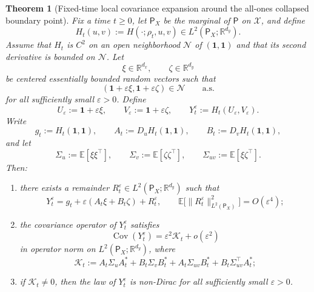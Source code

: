 \documentclass[11pt]{article}
\newtheorem{theorem}{Theorem}[section]
\theoremstyle{definition}
\newcommand{\R}{\mathbb{R}}
\newcommand{\E}{\mathbb{E}}
\begin{document}
\begin{theorem}[Fixed-time local covariance expansion around the all-ones collapsed boundary point]
\label{thm:local-covariance}
Fix a time $t\ge 0$, let $\mathsf P_X$ be the marginal of $\mathsf P$ on
$\mathcal X$, and define
\[
  H_t(u,v)
  :=
  H(\cdot;\rho_t,u,v)
  \in
  L^2(\mathsf P_X;\R^{d_y}).
\]
Assume that $H_t$ is $C^2$ on an open neighborhood $\mathcal N$ of
$(\mathbf 1,\mathbf 1)$ and that its second derivative is bounded on
$\mathcal N$. Let
\[
  \xi\in\R^{d_x},
  \qquad
  \zeta\in\R^{d_y}
\]
be centered essentially bounded random vectors such that
\[
  (\mathbf 1+\varepsilon\xi,\mathbf 1+\varepsilon\zeta)\in\mathcal N
  \qquad
  \text{a.s.}
\]
for all sufficiently small $\varepsilon>0$. Define
\[
  U_\varepsilon:=\mathbf 1+\varepsilon\xi,
  \qquad
  V_\varepsilon:=\mathbf 1+\varepsilon\zeta,
  \qquad
  Y_t^\varepsilon:=H_t(U_\varepsilon,V_\varepsilon).
\]
Write
\[
  g_t:=H_t(\mathbf 1,\mathbf 1),
  \qquad
  A_t:=D_u H_t(\mathbf 1,\mathbf 1),
  \qquad
  B_t:=D_v H_t(\mathbf 1,\mathbf 1),
\]
and let
\[
  \Sigma_u:=\E[\xi\xi^\top],
  \qquad
  \Sigma_v:=\E[\zeta\zeta^\top],
  \qquad
  \Sigma_{uv}:=\E[\xi\zeta^\top].
\]
Then:
\begin{enumerate}[label=(\roman*),leftmargin=2em]
  \item there exists a remainder
  \(
    R_t^\varepsilon\in L^2(\mathsf P_X;\R^{d_y})
  \)
  such that
  \begin{equation}
    Y_t^\varepsilon
    =
    g_t+\varepsilon(A_t\xi+B_t\zeta)+R_t^\varepsilon,
    \qquad
    \E\bigl[\|R_t^\varepsilon\|_{L^2(\mathsf P_X)}^2\bigr]
    =
    O(\varepsilon^4);
    \label{eq:local-linearization}
  \end{equation}
  \item the covariance operator of $Y_t^\varepsilon$ satisfies
  \begin{equation}
    \operatorname{Cov}(Y_t^\varepsilon)
    =
    \varepsilon^2\mathcal K_t+o(\varepsilon^2)
    \label{eq:local-cov-op}
  \end{equation}
  in operator norm on $L^2(\mathsf P_X;\R^{d_y})$, where
  \begin{equation}
    \mathcal K_t
    :=
    A_t\Sigma_u A_t^*
    +
    B_t\Sigma_v B_t^*
    +
    A_t\Sigma_{uv} B_t^*
    +
    B_t\Sigma_{uv}^\top A_t^*;
    \label{eq:local-cov-operator}
  \end{equation}
  \item if $\mathcal K_t\neq 0$, then the law of $Y_t^\varepsilon$ is non-Dirac
  for all sufficiently small $\varepsilon>0$.

\end{enumerate}
\end{theorem}
\end{document}

